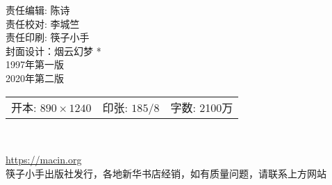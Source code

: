 \begin{center}
        \vfill
        \bigskip

        {责任编辑: 陈\hspace{2em}诗 \\ 责任校对: 李\hspace{0.5em}城\hspace{0.5em}竺\\ 
        责任印刷: 筷子小手\\封面设计：烟云幻梦}
        \vfill
        \bigskip
        *\\
        \bigskip
        {1997年第一版 \\ 2020年第二版}\\
        {\begin{tabular}{lll} 开本: $890\times1240 $ & 印张: $18 5/8$ & 字数: 2100万\\  
        \end{tabular}}\\ 

        \bigskip

        \href{https://macin.org}{https://macin.org}\\ 
        筷子小手出版社发行，各地新华书店经销，如有质量问题，请联系上方网站\\ 
    
    \end{center}






